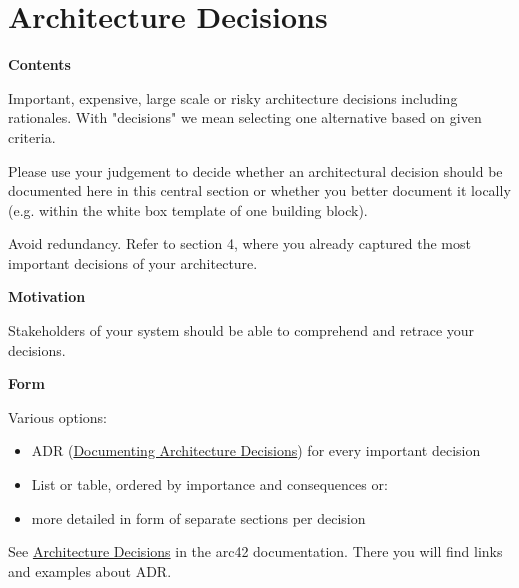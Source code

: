 \hypertarget{section-design-decisions}{%
\section{Architecture Decisions}\label{section-design-decisions}}

\textbf{Contents}

Important, expensive, large scale or risky architecture decisions
including rationales. With "decisions" we mean selecting one alternative
based on given criteria.

Please use your judgement to decide whether an architectural decision
should be documented here in this central section or whether you better
document it locally (e.g. within the white box template of one building
block).

Avoid redundancy. Refer to section 4, where you already captured the
most important decisions of your architecture.

\textbf{Motivation}

Stakeholders of your system should be able to comprehend and retrace
your decisions.

\textbf{Form}

Various options:

\begin{itemize}
\item
  ADR
  (\href{https://cognitect.com/blog/2011/11/15/documenting-architecture-decisions}{Documenting
  Architecture Decisions}) for every important decision
\item
  List or table, ordered by importance and consequences or:
\item
  more detailed in form of separate sections per decision
\end{itemize}

See \href{https://docs.arc42.org/section-9/}{Architecture Decisions} in
the arc42 documentation. There you will find links and examples about
ADR.
